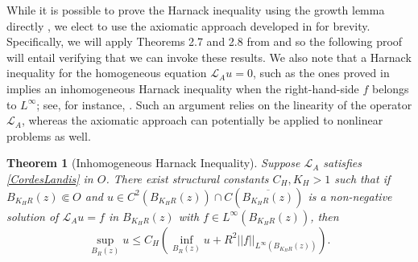 \documentclass[12pt]{amsart}
\newtheorem{Theorem}{Theorem}[section]
\newcommand{\Lop}{\mathcal{L}}
\def \L {\mathcal{L}}
\begin{document}
While it is possible to prove the Harnack inequality using the growth lemma directly \cite{LandisBook}, we elect to use the axiomatic approach developed in \cite{DiFGutLan, Safometric, GM2018} for brevity. Specifically, we will apply Theorems 2.7 and 2.8 from \cite{GM2018} and so the following proof will entail verifying that we can invoke these results. We also note that a Harnack inequality for the homogeneous equation $\L_A u = 0$, such as the ones proved in \cite{GT2011, T2014, AGT2017} implies an inhomogeneous Harnack inequality when the right-hand-side $f$ belongs to $L^{\infty}$; see, for instance, \cite[proof of Theorem 5.5]{Gutierrez-Lanconelli-2003}. Such an argument relies on the linearity of the operator $\L_A$, whereas the axiomatic approach can potentially be applied to nonlinear problems as well.

\begin{Theorem}[Inhomogeneous Harnack Inequality]\label{thm:Harnack}
Suppose $\L_A$ satisfies \eqref{CordesLandis} in $O$. There exist structural constants $C_H, K_H > 1$ such that if $B_{K_H R}(z)\Subset O$ and $u \in C^2(B_{K_H R}(z)) \cap C(\overline{B_{K_H R}(z)})$ is a non-negative solution of  $\Lop_A u = f$ in $B_{K_H R}(z)$ with $f \in L^{\infty}(B_{K_H R}(z))$, then
\begin{equation}\label{HarnacK}
\sup_{B_R(z)} u \leq C_H\left(\inf_{B_R(z)} u + R^2 ||f||_{L^{\infty}(B_{K_H R}(z))} \right).
\end{equation}
\end{Theorem}
\end{document}
